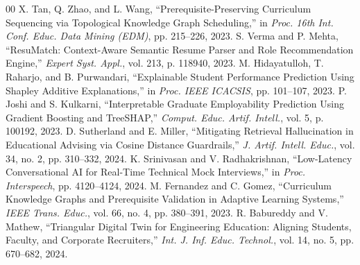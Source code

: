 \documentclass[conference]{IEEEtran}
\begin{document}
\begin{thebibliography}{00}
 X. Tan, Q. Zhao, and L. Wang, ``Prerequisite-Preserving Curriculum Sequencing via Topological Knowledge Graph Scheduling,'' in \textit{Proc. 16th Int. Conf. Educ. Data Mining (EDM)}, pp. 215--226, 2023.
 S. Verma and P. Mehta, ``ResuMatch: Context-Aware Semantic Resume Parser and Role Recommendation Engine,'' \textit{Expert Syst. Appl.}, vol. 213, p. 118940, 2023.
 M. Hidayatulloh, T. Raharjo, and B. Purwandari, ``Explainable Student Performance Prediction Using Shapley Additive Explanations,'' in \textit{Proc. IEEE ICACSIS}, pp. 101--107, 2023.
 P. Joshi and S. Kulkarni, ``Interpretable Graduate Employability Prediction Using Gradient Boosting and TreeSHAP,'' \textit{Comput. Educ. Artif. Intell.}, vol. 5, p. 100192, 2023.
 D. Sutherland and E. Miller, ``Mitigating Retrieval Hallucination in Educational Advising via Cosine Distance Guardrails,'' \textit{J. Artif. Intell. Educ.}, vol. 34, no. 2, pp. 310--332, 2024.
 K. Srinivasan and V. Radhakrishnan, ``Low-Latency Conversational AI for Real-Time Technical Mock Interviews,'' in \textit{Proc. Interspeech}, pp. 4120--4124, 2024.
 M. Fernandez and C. Gomez, ``Curriculum Knowledge Graphs and Prerequisite Validation in Adaptive Learning Systems,'' \textit{IEEE Trans. Educ.}, vol. 66, no. 4, pp. 380--391, 2023.
 R. Babureddy and V. Mathew, ``Triangular Digital Twin for Engineering Education: Aligning Students, Faculty, and Corporate Recruiters,'' \textit{Int. J. Inf. Educ. Technol.}, vol. 14, no. 5, pp. 670--682, 2024.
\end{thebibliography}
\end{document}
